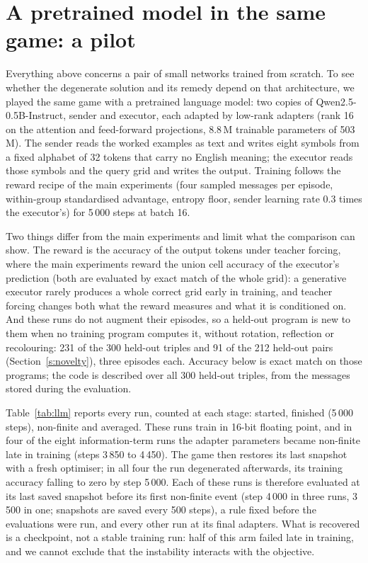 \documentclass[11pt]{article}
\begin{document}
\begin{table}[h]\centering\small\resizebox{\textwidth}{!}{}
\caption{Contrasts between conditions. Runs: number of runs in each condition; means in the same order.}\label{tab:stats}
\end{table}

\section{A pretrained model in the same game: a pilot}\label{s:llm}
Everything above concerns a pair of small networks trained from scratch. To see whether the degenerate solution and
its remedy depend on that architecture, we played the same game with a pretrained language model: two copies of
Qwen2.5-0.5B-Instruct, sender and executor, each adapted by low-rank adapters (rank 16 on the attention and
feed-forward projections, 8.8\,M trainable parameters of 503\,M). The sender reads the worked examples as text and
writes eight symbols from a fixed alphabet of 32 tokens that carry no English meaning; the executor reads those
symbols and the query grid and writes the output. Training follows the reward recipe of the main experiments (four
sampled messages per episode, within-group standardised advantage, entropy floor, sender learning rate 0.3 times
the executor's) for 5\,000 steps at batch 16.

Two things differ from the main experiments and limit what the comparison can show. The reward is the accuracy of
the output tokens under teacher forcing, where the main experiments reward the union cell accuracy of the executor's
prediction (both are evaluated by exact match of the whole grid): a generative executor rarely produces a whole
correct grid early in training, and teacher forcing changes both what the reward measures and what it is
conditioned on. And these runs do not augment their episodes, so a held-out program is new to them when no training
program computes it, without rotation, reflection or recolouring: 231 of the 300 held-out triples and 91 of the 212
held-out pairs (Section~\ref{s:novelty}), three episodes each. Accuracy below is exact match on those programs; the
code is described over all 300 held-out triples, from the messages stored during the evaluation.

Table~\ref{tab:llm} reports every run, counted at each stage: started, finished (5\,000 steps), non-finite and
averaged. These runs train in 16-bit floating point, and in four of the eight information-term runs the adapter
parameters became non-finite late in training (steps 3\,850 to 4\,450). The game then restores its last snapshot with
a fresh optimiser; in all four the run degenerated afterwards, its training accuracy falling to zero by step 5\,000.
Each of these runs is therefore evaluated at its last saved snapshot before its first non-finite event (step 4\,000
in three runs, 3\,500 in one; snapshots are saved every 500 steps), a rule fixed before the evaluations were run,
and every other run at its final adapters. What is recovered is a checkpoint, not a stable training run: half of
this arm failed late in training, and we cannot exclude that the instability interacts with the objective.
\end{document}
